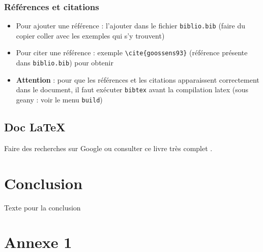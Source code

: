 \documentclass{pjsivi}
\begin{document}
\subsection{Références et citations}

\begin{itemize}
\item Pour ajouter une référence : l'ajouter dans le fichier \verb#biblio.bib# (faire du copier coller avec les exemples qui s'y trouvent)
\item Pour citer une référence : exemple \verb#\cite{goossens93}# (référence présente dans \verb#biblio.bib#) pour obtenir \cite{goossens93}
\item {\bf Attention} : pour que les références et les citations apparaissent correctement dans le document, il faut exécuter \verb#bibtex# avant la compilation latex (sous geany : voir le menu \verb#build#)
\end{itemize}

\section{Doc \LaTeX}
Faire des recherches sur Google ou consulter ce livre très complet
\cite{goossens93}.

\chapter*{Conclusion} 

Texte pour la conclusion

 

\appendix  %
\chapter*{Annexe 1}
\end{document}
